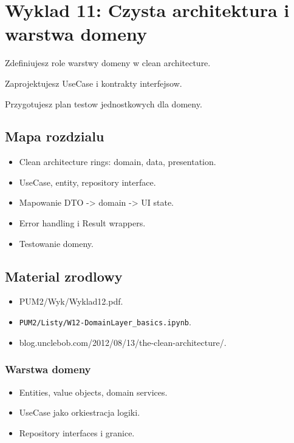 \chapter{Wyklad 11: Czysta architektura i warstwa domeny}

\begin{learningobjectives}
  \item Zdefiniujesz role warstwy domeny w clean architecture.
  \item Zaprojektujesz UseCase i kontrakty interfejsow.
  \item Przygotujesz plan testow jednostkowych dla domeny.
\end{learningobjectives}

\section{Mapa rozdzialu}
\begin{itemize}
  \item Clean architecture rings: domain, data, presentation.
  \item UseCase, entity, repository interface.
  \item Mapowanie DTO -> domain -> UI state.
  \item Error handling i Result wrappers.
  \item Testowanie domeny.
\end{itemize}

\section{Material zrodlowy}
\begin{itemize}
  \item PUM2/Wyk/Wyklad12.pdf.
  \item \texttt{PUM2/Listy/W12-DomainLayer\_basics.ipynb}.
  \item blog.unclebob.com/2012/08/13/the-clean-architecture/.
\end{itemize}

\subsection{Warstwa domeny}
\begin{itemize}
  \item Entities, value objects, domain services.
  \item UseCase jako orkiestracja logiki.
  \item Repository interfaces i granice.
\end{itemize}

